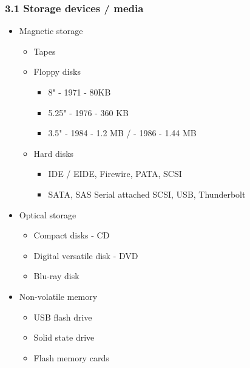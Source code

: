 \begin{frame}[fragile]
  \frametitle{3.1 Storage devices / media}
    \begin{itemize}
        \item Magnetic storage
        \begin{itemize}
            \item Tapes
            \item Floppy disks
            \begin{itemize}
                \item 8" - 1971 - 80KB
                \item 5.25" - 1976 - 360 KB
                \item 3.5" - 1984 - 1.2 MB / - 1986 - 1.44 MB
            \end{itemize}
            \item Hard disks
            \begin{itemize}
                \item IDE / EIDE, Firewire, PATA, SCSI
                \item SATA, SAS Serial attached SCSI, USB, Thunderbolt
            \end{itemize}
        \end{itemize}
        \item Optical storage
        \begin{itemize}
            \item Compact disks - CD
            \item Digital versatile disk - DVD
            \item Blu-ray disk
        \end{itemize}
        \item Non-volatile memory
        \begin{itemize}
            \item USB flash drive
            \item Solid state drive
            \item Flash memory cards
        \end{itemize}
    \end{itemize}
\end{frame}


